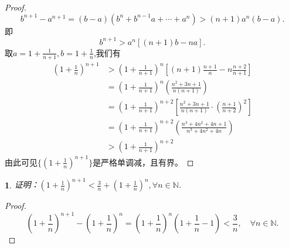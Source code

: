 \documentclass[utf8]{book}
\newtheorem{example}{}[section]             %
\begin{document}
\begin{proof}
$$b^{n+1}-a^{n+1}=(b-a)(b^{n}+b^{n-1}a+\cdots+a^n) > (n+1)a^n(b-a).$$
即$$b^{n+1}> a^n\left[(n+1)b-na\right].$$
取$a=1+\frac{1}{n+1}, b = 1+\frac{1}{n}$,我们有
\begin{equation*}
\begin{split}
\left(1+\frac{1}{n}\right)^{n+1} &> \left(1+\frac{1}{n+1}\right)^n\left[(n+1)\frac{n+1}{n}-n\frac{n+2}{n+1}\right]\\
&=\left(1+\frac{1}{n+1}\right)^n\left(\frac{n^2+3n+1}{n(n+1)}\right)\\
&=\left(1+\frac{1}{n+1}\right)^{n+2}\left[\frac{n^2+3n+1}{n(n+1)}\cdot\left(\frac{n+1}{n+2}\right)^2\right]\\
&=\left(1+\frac{1}{n+1}\right)^{n+2}\left(\frac{n^3+4n^2+4n+1}{n^3+4n^2+4n}\right)\\
&>\left(1+\frac{1}{n+1}\right)^{n+2}
\end{split}
\end{equation*}
由此可见$\{\left(1+\frac{1}{n}\right)^{n+1}\}$是严格单调减，且有界。
\end{proof}
\begin{example}
证明：$\left(1+\frac{1}{n}\right)^{n+1} < \frac{3}{n}+\left(1+\frac{1}{n}\right)^n, \forall n\in\mathbb{N}$.
\end{example}
\begin{proof}
$$\left(1+\frac{1}{n}\right)^{n+1} - \left(1+\frac{1}{n}\right)^n = \left(1+\frac{1}{n}\right)^n\left(1+\frac{1}{n} - 1\right)<\frac{3}{n}, \quad\forall n\in\mathbb{N}.$$
\end{proof}
\end{document}
